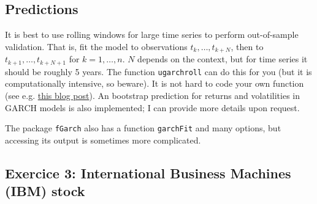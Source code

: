 \documentclass[]{book}
\newenvironment{Shaded}{\begin{snugshade}}{\end{snugshade}}
\newcommand{\CommentTok}[1]{\textcolor[rgb]{0.56,0.35,0.01}{\textit{#1}}}
\newcommand{\DataTypeTok}[1]{\textcolor[rgb]{0.13,0.29,0.53}{#1}}
\newcommand{\DecValTok}[1]{\textcolor[rgb]{0.00,0.00,0.81}{#1}}
\newcommand{\KeywordTok}[1]{\textcolor[rgb]{0.13,0.29,0.53}{\textbf{#1}}}
\newcommand{\NormalTok}[1]{#1}
\newcommand{\OperatorTok}[1]{\textcolor[rgb]{0.81,0.36,0.00}{\textbf{#1}}}
\newcommand{\OtherTok}[1]{\textcolor[rgb]{0.56,0.35,0.01}{#1}}
\newcommand{\StringTok}[1]{\textcolor[rgb]{0.31,0.60,0.02}{#1}}
\begin{document}
\hypertarget{predictions}{%
\subsection{Predictions}\label{predictions}}

It is best to use rolling windows for large time series to perform
out-of-sample validation. That is, fit the model to observations
\(t_k, \ldots, t_{k+N}\), then to \(t_{k+1}, \ldots, t_{k+N+1}\) for
\(k=1, \ldots, n\). \(N\) depends on the context, but for time series it
should be roughly 5 years. The function \texttt{ugarchroll} can do this
for you (but it is computationally intensive, so beware). It is not hard
to code your own function (see e.g.
\href{http://unstarched.net/2012/12/26/rolling-garch-forecasts/}{this
blog post}). An bootstrap prediction for returns and volatilities in
GARCH models is also implemented; I can provide more details upon
request.

The package \texttt{fGarch} also has a function \texttt{garchFit} and
many options, but accessing its output is sometimes more complicated.

\begin{Shaded}
\end{Shaded}

\hypertarget{exercice-3-international-business-machines-ibm-stock}{%
\subsection{Exercice 3: International Business Machines (IBM)
stock}\label{exercice-3-international-business-machines-ibm-stock}}
\end{document}
